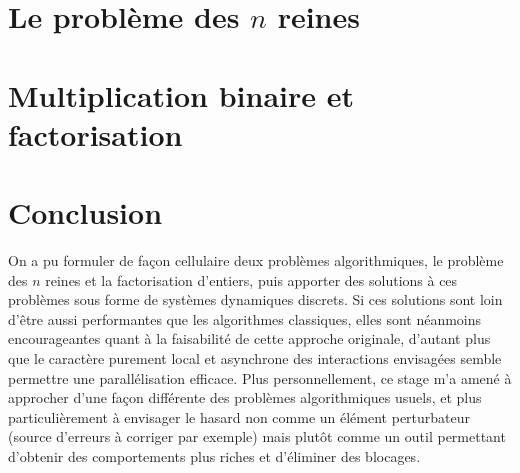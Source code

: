 \documentclass[11pt, openany, a4paper]{article}
\newcommand{\ANNOT}[1]{
  ~\linebreak
  \centerline{
    \large\fcolorbox{black}{bleuclair}{
      \begin{minipage}[h]{.8\linewidth}
      #1
      \end{minipage}
    }
  }
}
\begin{document}
\part*{Le problème des $n$ reines}
\label{part:nreines}




\setcounter{section}{0}
\part*{Multiplication binaire et factorisation}
\label{part:facto}





\part*{Conclusion}

On a pu formuler de façon cellulaire deux problèmes algorithmiques, le problème des $n$ reines et la factorisation d'entiers, puis apporter des solutions à ces problèmes sous forme de systèmes dynamiques discrets. Si ces solutions sont loin d'être aussi performantes que les algorithmes classiques, elles sont néanmoins encourageantes quant à la faisabilité de cette approche originale, d'autant plus que le caractère purement local et asynchrone des interactions envisagées semble permettre une parallélisation efficace. 
Plus personnellement, ce stage m'a amené à approcher d'une façon différente des problèmes algorithmiques usuels, et plus particulièrement à envisager le hasard non comme un élément perturbateur (source d'erreurs à corriger par exemple) mais plutôt comme un outil permettant d'obtenir des comportements plus riches et d'éliminer des blocages. 






\end{document}
